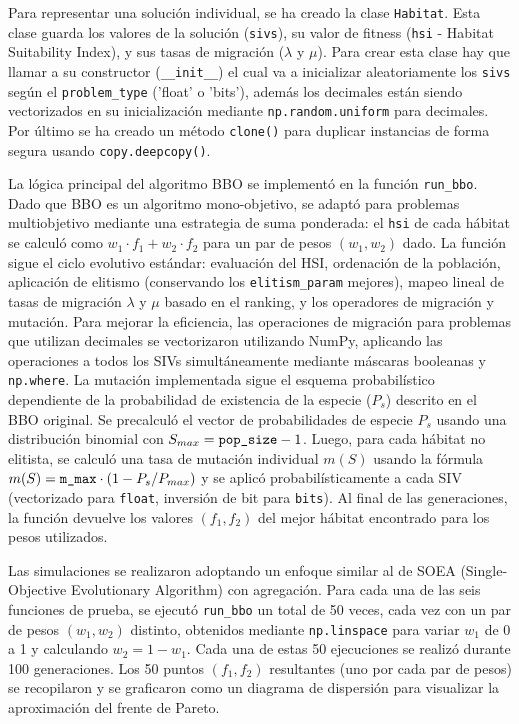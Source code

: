 \documentclass{article}
\begin{document}
Para representar una solución individual, se ha creado la clase \verb|Habitat|. Esta clase guarda los valores de la solución (\verb|sivs|), su valor de fitness (\verb|hsi| - Habitat Suitability Index), y sus tasas de migración ($\lambda$ y $\mu$). Para crear esta clase hay que llamar a su constructor (\verb|__init__|) el cual va a inicializar aleatoriamente los \verb|sivs| según el \verb|problem_type| ('float' o 'bits'), además los decimales están siendo vectorizados en su inicialización mediante \verb|np.random.uniform| para decimales. Por último se ha creado un método \verb|clone()| para duplicar instancias de forma segura usando \verb|copy.deepcopy()|.

La lógica principal del algoritmo BBO se implementó en la función \verb|run_bbo|. Dado que BBO es un algoritmo mono-objetivo, se adaptó para problemas multiobjetivo mediante una estrategia de suma ponderada: el \verb|hsi| de cada hábitat se calculó como $w_1 \cdot f_1 + w_2 \cdot f_2$ para un par de pesos $(w_1, w_2)$ dado. La función sigue el ciclo evolutivo estándar: evaluación del HSI, ordenación de la población, aplicación de elitismo (conservando los \verb|elitism_param| mejores), mapeo lineal de tasas de migración $\lambda$ y $\mu$ basado en el ranking, y los operadores de migración y mutación. Para mejorar la eficiencia, las operaciones de migración para problemas que utilizan decimales se vectorizaron utilizando NumPy, aplicando las operaciones a todos los SIVs simultáneamente mediante máscaras booleanas y \verb|np.where|. La mutación implementada sigue el esquema probabilístico dependiente de la probabilidad de existencia de la especie ($P_s$) descrito en el BBO original. Se precalculó el vector de probabilidades de especie $P_s$ usando una distribución binomial con $S_{max} = \verb|pop_size| - 1$. Luego, para cada hábitat no elitista, se calculó una tasa de mutación individual $m(S)$ usando la fórmula $m(S) = \verb|m_max| \cdot (1 - P_s / P_{max})$ y se aplicó probabilísticamente a cada SIV (vectorizado para \verb|float|, inversión de bit para \verb|bits|). Al final de las generaciones, la función devuelve los valores $(f_1, f_2)$ del mejor hábitat encontrado para los pesos utilizados.

Las simulaciones se realizaron adoptando un enfoque similar al de SOEA (Single-Objective Evolutionary Algorithm) con agregación. Para cada una de las seis funciones de prueba, se ejecutó \verb|run_bbo| un total de 50 veces, cada vez con un par de pesos $(w_1, w_2)$ distinto, obtenidos mediante \verb|np.linspace| para variar $w_1$ de 0 a 1 y calculando $w_2 = 1 - w_1$. Cada una de estas 50 ejecuciones se realizó durante 100 generaciones. Los 50 puntos $(f_1, f_2)$ resultantes (uno por cada par de pesos) se recopilaron y se graficaron como un diagrama de dispersión para visualizar la aproximación del frente de Pareto.
\end{document}
